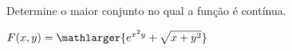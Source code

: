 
Determine o maior conjunto no qual a função é contínua.


\item $ F(x,y)=\mathlarger{e^{x^2y}+\sqrt{x+y^2}}$